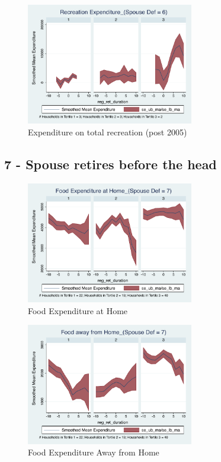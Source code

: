 \documentclass[11pt,onecolumn]{article}
\numberwithin{figure}{section}
\begin{document}
\begin{figure}[h]
	\caption{Expenditure on total recreation (post 2005)}
	\centering
	\includegraphics[width=0.65\textwidth]{../ConsumptionPostRetirement_by_SpouseDef_Cats/Smoothed/6/spouse_def_total_recreation_2005_real.pdf}
\end{figure}

\clearpage

\subsection{7 - Spouse retires before the head}

\begin{figure}[h]
	\caption{Food Expenditure at Home}
	\centering
	\includegraphics[width=0.65\textwidth]{../ConsumptionPostRetirement_by_SpouseDef_Cats/Smoothed/7/spouse_def_total_foodexp_home_real.pdf}
\end{figure}


\begin{figure}[h]
	\caption{Food Expenditure Away from Home}
	\centering
	\includegraphics[width=0.65\textwidth]{../ConsumptionPostRetirement_by_SpouseDef_Cats/Smoothed/7/spouse_def_total_foodexp_away_real.pdf}
\end{figure}
\end{document}
